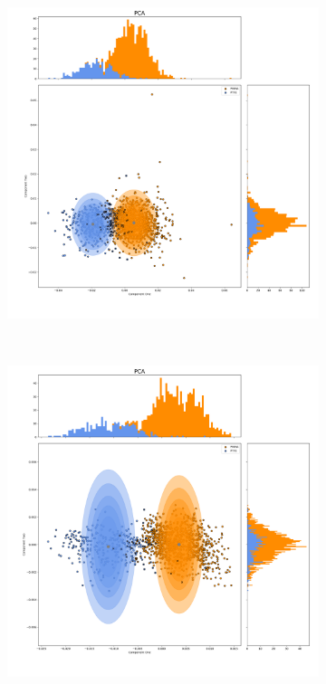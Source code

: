 \documentclass[a4paper,11pt]{article}
\begin{document}
\begin{figure}[htbp]
    \centering
    \begin{subfigure}[b]{0.32\textwidth}
        \includegraphics[width=\textwidth]{figures/PCAgoodbefore.png}
    \end{subfigure}
    ~ %
    \begin{subfigure}[b]{0.32\textwidth}
        \includegraphics[width=\textwidth]{figures/PCAgoodafter.png}

\end{subfigure}
\end{figure}
\end{document}
